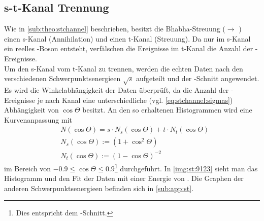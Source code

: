 \subsection{s-t-Kanal Trennung}
Wie in \autoref{sub:theo:stchannel} beschrieben, besitzt die Bhabha-Streuung (\ee $\to$ \ee) einen s-Kanal (Annihilation) 
und einen t-Kanal (Streuung). Da nur im s-Kanal ein reelles \Z -Boson entsteht, verfälschen die Ereignisse im t-Kanal die Anzahl 
der \ee -Ereignisse. \\
Um den s-Kanal vom t-Kanal zu trennen, werden die echten Daten nach den verschiedenen Schwerpunktsenergieen $\sqrt{s}$ aufgeteilt und 
der \ee -Schnitt angewendet. Es wird die Winkelabhängigkeit der Daten überprüft, da die Anzahl der \ee -Ereignisse 
je nach Kanal eine unterschiedliche (vgl. \autoref{eq:stchannel:sigmas}) Abhängigkeit von $\cos \Theta$ besitzt. An den so erhaltenen Histogrammen wird 
eine Kurvenanpassung mit 
\begin{equation}
    \begin{split}
    	& N(\cos \Theta) = s \cdot N_s(\cos \Theta ) + t \cdot N_t(\cos \Theta) \\
    	& N_s(\cos \Theta) := \left( 1 + \cos^2 \Theta \right) \\
    	& N_t (\cos \Theta) := \left( 1 - \cos \Theta \right)^{-2}
    \end{split}
\end{equation}
im Bereich von $-0.9 \leq \cos \Theta \leq 0.9$\footnote{Dies entspricht dem \ee -Schnitt.} durchgeführt. In \autoref{img:st:9123} sieht man 
das Histogramm und den Fit der Daten mit einer Energie von . Die Graphen der anderen Schwerpunktsenergieen befinden sich in 
\autoref{sub:app:st}.

